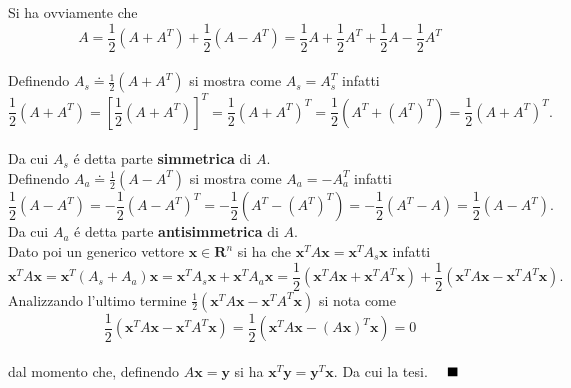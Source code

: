 Si ha ovviamente che
\[
A = \frac{1}{2}(A+A^T) + \frac{1}{2}(A-A^T)=\frac{1}{2}A + \frac{1}{2}A^T + \frac{1}{2}A - \frac{1}{2}A^T
\]
\\
Definendo $A_s \doteq \frac{1}{2}(A+A^T)$ si mostra come $A_s = A_s^T$ infatti
\[
\frac{1}{2}(A+A^T) = [ \frac{1}{2}(A+A^T)]^T = \frac{1}{2}(A+A^T)^T = \frac{1}{2}(A^T+(A^T)^T) = \frac{1}{2}(A+A^T)^T.
\]
\\
Da cui $A_s$ \'e detta parte \textbf{simmetrica} di $A$.
\\
Definendo $A_a \doteq \frac{1}{2}(A-A^T)$ si mostra come $A_a = -A_a^T$ infatti
\[
\frac{1}{2}(A-A^T) = -\frac{1}{2}(A-A^T)^T = -\frac{1}{2}(A^T-(A^T)^T) = -\frac{1}{2}(A^T-A) = \frac{1}{2}(A-A^T).
\]
Da cui $A_a$ \'e detta parte \textbf{antisimmetrica} di $A$.
\\
Dato poi un generico vettore $\mathbf{x} \in \mathbf{R}^n$ si ha che $\mathbf{x}^TA\mathbf{x} = \mathbf{x}^TA_s\mathbf{x}$ infatti
\[
\mathbf{x}^TA\mathbf{x} = \mathbf{x}^T(A_s + A_a)\mathbf{x} = \mathbf{x}^TA_s\mathbf{x} + \mathbf{x}^TA_a\mathbf{x} = \frac{1}{2}(\mathbf{x}^TA\mathbf{x} + \mathbf{x}^TA^T\mathbf{x}) + \frac{1}{2}(\mathbf{x}^TA\mathbf{x} - \mathbf{x}^TA^T\mathbf{x}).
\]
Analizzando l'ultimo termine $\frac{1}{2}(\mathbf{x}^TA\mathbf{x} - \mathbf{x}^TA^T\mathbf{x})$ si nota come
\[ \frac{1}{2}(\mathbf{x}^TA\mathbf{x} - \mathbf{x}^TA^T\mathbf{x}) = \frac{1}{2}(\mathbf{x}^TA\mathbf{x} - (A\mathbf{x})^T\mathbf{x})=0
\]
\\
dal momento che, definendo $A\mathbf{x}=\mathbf{y}$ si ha $\mathbf{x}^T\mathbf{y}= \mathbf{y}^T\mathbf{x}.$
Da cui la tesi.  $\hspace{1em}\blacksquare$
